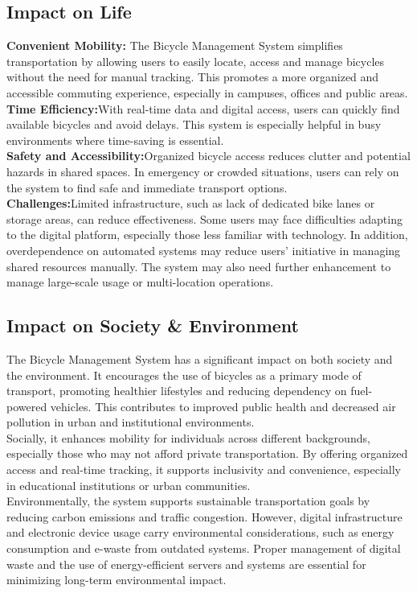 \subsection{Impact on Life}
\textbf {Convenient Mobility:} The Bicycle Management System simplifies transportation by allowing users to easily locate, access and manage bicycles without the need for manual tracking. This promotes a more organized and accessible commuting experience, especially in campuses, offices and public areas.\\
\textbf{Time Efficiency:}With real-time data and digital access, users can quickly find available bicycles and avoid delays. This system is especially helpful in busy environments where time-saving is essential.\\
\textbf{Safety and Accessibility:}Organized bicycle access reduces clutter and potential hazards in shared spaces. In emergency or crowded situations, users can rely on the system to find safe and immediate transport options.\\
\textbf{Challenges:}Limited infrastructure, such as lack of dedicated bike lanes or storage areas, can reduce effectiveness. Some users may face difficulties adapting to the digital platform, especially those less familiar with technology. In addition, overdependence on automated systems may reduce users’ initiative in managing shared resources manually. The system may also need further enhancement to manage large-scale usage or multi-location operations.\cite{4.1.1}

\subsection{Impact on Society \& Environment}
The Bicycle Management System has a significant impact on both society and the environment. It encourages the use of bicycles as a primary mode of transport, promoting healthier lifestyles and reducing dependency on fuel-powered vehicles. This contributes to improved public health and decreased air pollution in urban and institutional environments.\\
Socially, it enhances mobility for individuals across different backgrounds, especially those who may not afford private transportation. By offering organized access and real-time tracking, it supports inclusivity and convenience, especially in educational institutions or urban communities.\\
Environmentally, the system supports sustainable transportation goals by reducing carbon emissions and traffic congestion. However, digital infrastructure and electronic device usage carry environmental considerations, such as energy consumption and e-waste from outdated systems. Proper management of digital waste and the use of energy-efficient servers and systems are essential for minimizing long-term environmental impact.\cite{4.1.2}

